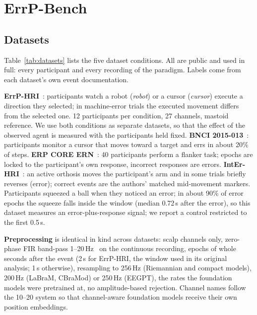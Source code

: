 \section{ErrP-Bench}
\label{sec:bench}

\subsection{Datasets}
Table~\ref{tab:datasets} lists the five dataset conditions. All are public and used in full: every
participant and every recording of the paradigm. Labels come from each dataset's own event documentation.

\begin{table}[t]
\centering
\caption{ErrP-Bench datasets. ``Error'' is the label-1 class; epochs are time-locked to the error-eliciting
event (feedback, machine action, response or orthosis perturbation).}
\label{tab:datasets}
\small
\resizebox{\linewidth}{!}{}
\end{table}

\textbf{ErrP-HRI}~\citep{ehrlich2019feasibility}: participants watch a robot (\emph{robot}) or a cursor
(\emph{cursor}) execute a direction they selected; in machine-error trials the executed movement differs from the
selected one. 12 participants per condition, 27 channels, mastoid reference. We use both conditions as separate
datasets, so that the effect of the observed agent is measured with the participants held fixed.
\textbf{BNCI 2015-013}~\citep{chavarriaga2010learning}: participants monitor a cursor that moves toward a target
and errs in about 20\% of steps. \textbf{ERP CORE ERN}~\citep{kappenman2021erpcore}: 40 participants perform a
flanker task; epochs are locked to the participant's own response, incorrect responses are errors.
\textbf{IntEr-HRI}~\citep{kueper2024eegemg,chari2024interhri}: an active orthosis moves the participant's arm
and in some trials briefly reverses (error); correct events are the authors' matched mid-movement markers.
Participants squeezed a ball when they noticed an error; in about 90\% of error epochs the squeeze falls inside
the window (median 0.72\,s after the error), so this dataset measures an error-plus-response signal; we report a
control restricted to the first 0.5\,s.

\textbf{Preprocessing} is identical in kind across datasets: scalp channels only, zero-phase FIR band-pass
1--20\,Hz~\citep{gramfort2013mne} on the continuous recording, epochs of whole seconds after the event (2\,s for
ErrP-HRI, the window used in its original analysis; 1\,s otherwise), resampling to 256\,Hz (Riemannian and compact models), 200\,Hz (LaBraM, CBraMod) or 250\,Hz (EEGPT), the rates
the foundation models were pretrained at, no amplitude-based rejection. Channel names follow the 10--20 system so that
channel-aware foundation models receive their own position embeddings.

